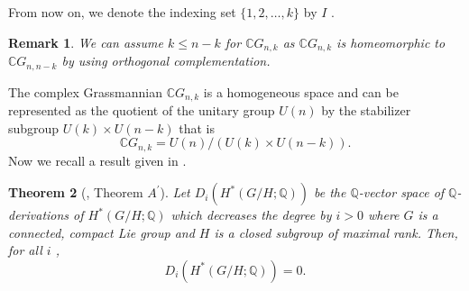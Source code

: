 \documentclass{amsart}
\newtheorem{theorem}{Theorem}[section]
\newtheorem{remark}[theorem]{Remark}
\newcommand{\rank}{\mathrm{Rank}}
\begin{document}
	From %
now on, we %
denote the indexing set $\{1,2,\dots, k\}$ by $I$%
.
	\begin{remark}
		We can assume  $k\leq n-k$ for  $\mathbb{C}G_{n,k}$ as $\mathbb{C}G_{n,k}$ is homeomorphic to $\mathbb{C}G_{n,n-k}$ by using orthogonal complementation.
	\end{remark}
	The %
complex Grassmannian $\mathbb{C}G_{n,k}$ is a homogeneous space and can be represented as the quotient of the unitary group $U(n)$ by the stabilizer subgroup %
$U(k)\times U(n-k)$ that is 
	\begin{equation}\label{cgn as hom}
		\mathbb{C}G_{n,k} = U(n)/ (U(k)\times U(n-k)). 
	\end{equation} Now %
we recall a result given %
in \cite{shiga-tezuka}.    
	\begin{theorem}[\cite{shiga-tezuka}, Theorem \(A^{'}\)]\label{Tezuka}
		Let %
$D_i(H^*(G/H;\mathbb{Q}))$ be the $\mathbb{Q}$-vector space of $\mathbb{Q}$-derivations of $H^*(G/H;\mathbb{Q})$ which decreases the degree %
by $i>0$ where %
$G$ is a connected, compact Lie group and $H$ is a closed subgroup of maximal %
rank.
		Then, for %
all $i$%
, $$D_i(H^*(G/H;\mathbb{Q})) =0.$$  
	\end{theorem}
\end{document}
